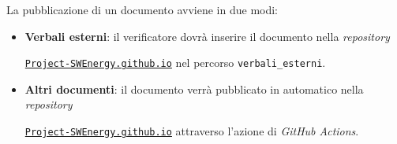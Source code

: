 La pubblicazione di un documento avviene in due modi:
\begin{itemize}
	\item \textbf{Verbali esterni}: il verificatore dovrà inserire il documento
	      nella \textit{repository}
	      \begin{sloppypar}
		      \href{https://github.com/Project-SWEnergy/Project-SWEnergy.github.io}{\texttt{Project-SWEnergy.github.io}}
		      nel percorso \texttt{verbali\_esterni}.
	      \end{sloppypar}
	\item \textbf{Altri documenti}: il documento verrà pubblicato in automatico
	      nella \textit{repository}
	      \begin{sloppypar}
		      \href{https://github.com/Project-SWEnergy/Project-SWEnergy.github.io}{\texttt{Project-SWEnergy.github.io}}
		      attraverso l'azione di \textit{GitHub Actions}.
	      \end{sloppypar}
\end{itemize}
